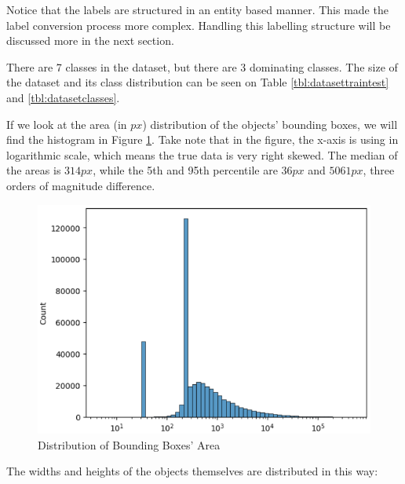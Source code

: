   Notice that the labels are structured in an entity based manner. This made the label conversion process
  more complex. Handling this labelling structure will be discussed more in the next section.

  There are 7 classes in the dataset, but there are 3 dominating classes.
  The size of the dataset and its class distribution can be seen on Table \ref{tbl:datasettraintest} and
  \ref{tbl:datasetclasses}.
  \begin{table}[H]
    \centering
    \label{tbl:datasettraintest}
    
  \end{table}
  \begin{table}[H]
    \centering
    \label{tbl:datasetclasses}
    
  \end{table}
  If we look at the area (in $px$) distribution of the objects' bounding boxes, we will find
  the histogram in Figure \ref{fig:areadist}. Take note that in the figure, the x-axis is 
  using in logarithmic scale, which means the true data is very right skewed.
  The median of the areas is $314 px$, while the 5th and 95th percentile are $36 px$ and $5061 px$, three orders of magnitude difference.

  \begin{figure}[H]
    \centering
    \includegraphics[width=.8\textwidth]{figures/area-dist.png}
    \caption{Distribution of Bounding Boxes' Area}
    \label{fig:areadist}
  \end{figure}
  The widths and heights of the objects themselves are distributed in this way:

